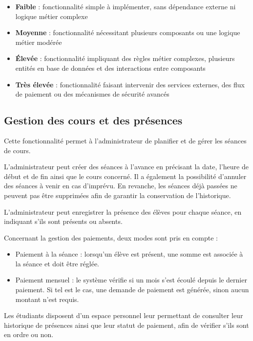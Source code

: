 \documentclass{article}
\begin{document}
\begin{itemize}
    \item \textbf{Faible} : fonctionnalité simple à implémenter, 
    sans dépendance externe ni logique métier complexe
    \item \textbf{Moyenne} : fonctionnalité nécessitant plusieurs 
    composants ou une logique métier modérée
    \item \textbf{Élevée} : fonctionnalité impliquant des règles 
    métier complexes, plusieurs entités en base de données 
    et des interactions entre composants
    \item \textbf{Très élevée} : fonctionnalité faisant intervenir 
    des services externes, des flux de paiement ou des mécanismes 
    de sécurité avancés
\end{itemize}

\subsection{Gestion des cours et des présences}

Cette fonctionnalité permet à l'administrateur de planifier et de gérer les séances de cours.

L'administrateur peut créer des séances à l'avance en précisant la date, l'heure de début et de fin ainsi que le cours concerné. Il a également la possibilité d'annuler des séances à venir en cas d'imprévu. En revanche, les séances déjà passées ne peuvent pas être supprimées afin de garantir la conservation de l'historique.

L'administrateur peut enregistrer la présence des élèves pour chaque séance, en indiquant s'ils sont présents ou absents.

Concernant la gestion des paiements, deux modes sont pris en compte :
\begin{itemize}
    \item Paiement à la séance : lorsqu'un élève est présent, une somme est associée à la séance et doit être réglée.
    \item Paiement mensuel : le système vérifie si un mois s'est écoulé depuis le dernier paiement. Si tel est le cas, une demande de paiement est générée, sinon aucun montant n'est requis.
\end{itemize}

Les étudiants disposent d'un espace personnel leur permettant de consulter leur historique de présences ainsi que leur statut de paiement, afin de vérifier s'ils sont en ordre ou non.
\end{document}

